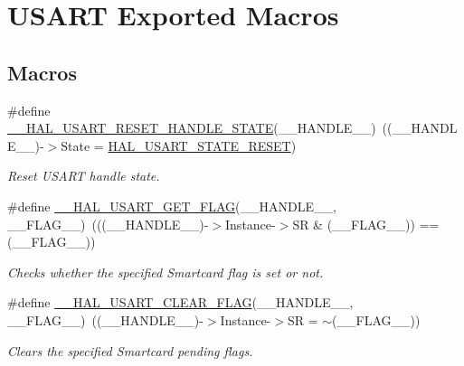 \hypertarget{group___u_s_a_r_t___exported___macros}{}\section{U\+S\+A\+RT Exported Macros}
\label{group___u_s_a_r_t___exported___macros}
\subsection*{Macros}
\begin{DoxyCompactItemize}
\item 
\#define \hyperlink{group___u_s_a_r_t___exported___macros_ga953ddcf8e901974e9f73e7d337238170}{\+\_\+\+\_\+\+H\+A\+L\+\_\+\+U\+S\+A\+R\+T\+\_\+\+R\+E\+S\+E\+T\+\_\+\+H\+A\+N\+D\+L\+E\+\_\+\+S\+T\+A\+TE}(\+\_\+\+\_\+\+H\+A\+N\+D\+L\+E\+\_\+\+\_\+)~((\+\_\+\+\_\+\+H\+A\+N\+D\+L\+E\+\_\+\+\_\+)-\/$>$State = \hyperlink{group___u_s_a_r_t___exported___types_gga502e7abdfa6b24f0f6b40cf60c7383c5ab78adc4ded45529f2cf9e74150e49696}{H\+A\+L\+\_\+\+U\+S\+A\+R\+T\+\_\+\+S\+T\+A\+T\+E\+\_\+\+R\+E\+S\+ET})
\begin{DoxyCompactList}\small\item\em Reset U\+S\+A\+RT handle state. \end{DoxyCompactList}\item 
\#define \hyperlink{group___u_s_a_r_t___exported___macros_ga16b9a5a85a8edc0464db168c2db21b3a}{\+\_\+\+\_\+\+H\+A\+L\+\_\+\+U\+S\+A\+R\+T\+\_\+\+G\+E\+T\+\_\+\+F\+L\+AG}(\+\_\+\+\_\+\+H\+A\+N\+D\+L\+E\+\_\+\+\_\+,  \+\_\+\+\_\+\+F\+L\+A\+G\+\_\+\+\_\+)~(((\+\_\+\+\_\+\+H\+A\+N\+D\+L\+E\+\_\+\+\_\+)-\/$>$Instance-\/$>$SR \& (\+\_\+\+\_\+\+F\+L\+A\+G\+\_\+\+\_\+)) == (\+\_\+\+\_\+\+F\+L\+A\+G\+\_\+\+\_\+))
\begin{DoxyCompactList}\small\item\em Checks whether the specified Smartcard flag is set or not. \end{DoxyCompactList}\item 
\#define \hyperlink{group___u_s_a_r_t___exported___macros_gaff3cb6ff740b240764e7844eaf3d6807}{\+\_\+\+\_\+\+H\+A\+L\+\_\+\+U\+S\+A\+R\+T\+\_\+\+C\+L\+E\+A\+R\+\_\+\+F\+L\+AG}(\+\_\+\+\_\+\+H\+A\+N\+D\+L\+E\+\_\+\+\_\+,  \+\_\+\+\_\+\+F\+L\+A\+G\+\_\+\+\_\+)~((\+\_\+\+\_\+\+H\+A\+N\+D\+L\+E\+\_\+\+\_\+)-\/$>$Instance-\/$>$SR = $\sim$(\+\_\+\+\_\+\+F\+L\+A\+G\+\_\+\+\_\+))
\begin{DoxyCompactList}\small\item\em Clears the specified Smartcard pending flags. \end{DoxyCompactList}\item 

\end{DoxyCompactItemize}
